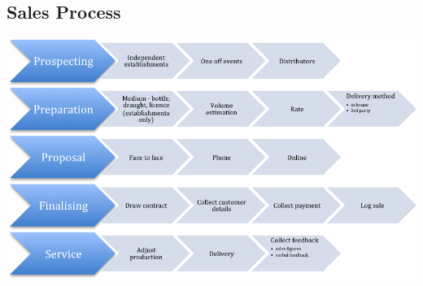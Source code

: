 \documentclass[11pt]{article}
\begin{document}
  \subsection{Sales Process}
  \includegraphics[width=\textwidth,keepaspectratio]{./process.png}
\end{document}
